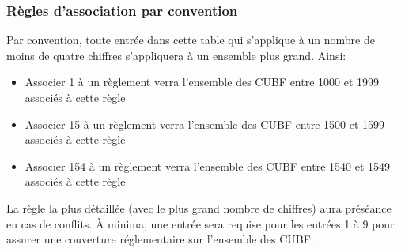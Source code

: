     \subsubsection{Règles d'association par convention}\label{sec:reg_association}
    Par convention, toute entrée dans cette table qui s'applique à un nombre de moins de quatre chiffres s'appliquera à un ensemble plus grand. Ainsi:
    \begin{itemize}
        \item Associer 1 à un règlement verra l'ensemble des \ac{CUBF} entre 1000 et 1999 associés à cette règle
        \item Associer 15 à un règlement verra l'ensemble des \ac{CUBF} entre 1500 et 1599 associés à cette règle
        \item Associer 154 à un règlement verra l'ensemble des \ac{CUBF} entre 1540 et 1549 associés à cette règle
    \end{itemize}
    La règle la plus détaillée (avec le plus grand nombre de chiffres) aura préséance en cas de conflits. À minima, une entrée sera requise pour les entrées 1 à 9 pour assurer une couverture réglementaire sur l'ensemble des \ac{CUBF}.\par
    
